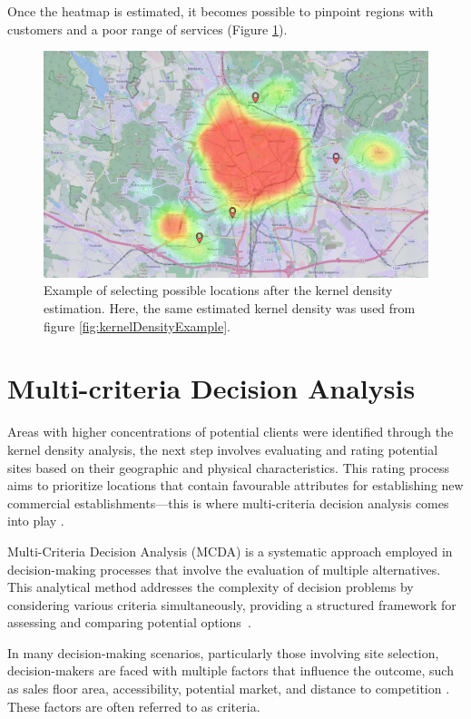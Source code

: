 Once the heatmap is estimated, it becomes possible to pinpoint regions with customers and a poor range of services \cite{roig2013retail} (Figure \ref{fig:selectPossibleLocations}).

\begin{figure}[ht]
	\centering
	\includegraphics[width=1\textwidth]{obrazky-figures/ch2/select-locations-example.png}
	\caption{Example of selecting possible locations after the kernel density estimation. Here, the same estimated kernel density was used from figure \ref{fig:kernelDensityExample}.}
	\label{fig:selectPossibleLocations}
\end{figure}


\section{Multi-criteria Decision Analysis}

Areas with higher concentrations of potential clients were identified through the kernel density analysis, the next step involves evaluating and rating potential sites based on their geographic and physical characteristics. This rating process aims to prioritize locations that contain favourable attributes for establishing new commercial establishments---this is where multi-criteria decision analysis comes into play \cite{roig2013retail}.

Multi-Criteria Decision Analysis (MCDA) is a systematic approach employed in decision-making processes that involve the evaluation of multiple alternatives. This analytical method addresses the complexity of decision problems by considering various criteria simultaneously, providing a structured framework for assessing and comparing potential options~\cite{durbach2012modeling}.

In many decision-making scenarios, particularly those involving site selection, decision-makers are faced with multiple factors that influence the outcome, such as sales floor area, accessibility, potential market, and distance to competition \cite{roig2013retail}. 
These factors are often referred to as criteria.

